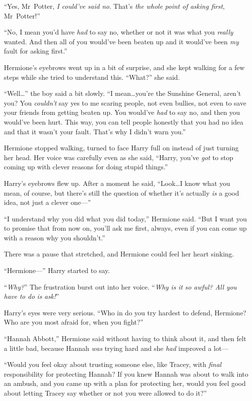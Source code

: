 “Yes, Mr~Potter, \emph{I could’ve said no}. That’s \emph{the whole point of asking first}, Mr~Potter!”

“No, I mean you’d have \emph{had} to say no, whether or not it was what you \emph{really} wanted. And then all of you would’ve been beaten up and it would’ve been \emph{my} fault for asking first.”

Hermione’s eyebrows went up in a bit of surprise, and she kept walking for a few steps while she tried to understand this. “What?” she said.

“Well…” the boy said a bit slowly. “I mean…you’re the Sunshine General, aren’t you? You \emph{couldn’t} say yes to me scaring people, not even bullies, not even to save your friends from getting beaten up. You would’ve \emph{had} to say no, and then you would’ve been hurt. This way, you can tell people honestly that you had no idea and that it wasn’t your fault. That’s why I didn’t warn you.”

Hermione stopped walking, turned to face Harry full on instead of just turning her head. Her voice was carefully even as she said, “Harry, you’ve \emph{got} to stop coming up with clever reasons for doing stupid things.”

Harry’s eyebrows flew up. After a moment he said, “Look…I know what you mean, of course, but there’s still the question of whether it’s actually \emph{is} a good idea, not just a clever one—”

“I understand why you did what you did today,” Hermione said. “But I want you to promise that from now on, you’ll ask me first, always, even if you can come up with a reason why you shouldn’t.”

There was a pause that stretched, and Hermione could feel her heart sinking.

“Hermione—” Harry started to say.

“\emph{Why?}” The frustration burst out into her voice. “\emph{Why is it so awful? All you have to do is ask!}”

Harry’s eyes were very serious. “Who in \SPHEW{} do you try hardest to defend, Hermione? Who are you most afraid for, when you fight?”

“Hannah Abbott,” Hermione said without having to think about it, and then felt a little bad, because Hannah \emph{was} trying hard and she \emph{had} improved a lot—

“Would you feel okay about trusting someone else, like Tracey, with \emph{final} responsibility for protecting Hannah? If you knew Hannah was about to walk into an ambush, and you came up with a plan for protecting her, would you feel good about letting Tracey say whether or not you were allowed to do it?”

